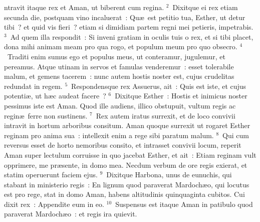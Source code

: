 \bchapter
{}ntravit itaque rex et Aman, ut biberent cum regina.
${}^{2}$~Dixitque ei rex etiam secunda die, postquam vino incaluerat~: Qu\ae\ est petitio tua, Esther, ut detur tibi~? et quid vis fieri~? etiam si dimidiam partem regni mei petieris, impetrabis.
${}^{3}$~Ad quem illa respondit~: Si inveni gratiam in oculis tuis o rex, et si tibi placet, dona mihi animam meam pro qua rogo, et populum meum pro quo obsecro.
${}^{4}$~Traditi enim sumus ego et populus meus, ut conteramur, jugulemur, et pereamus. Atque utinam in servos et famulas venderemur~: esset tolerabile malum, et gemens tacerem~: nunc autem hostis noster est, cujus crudelitas redundat in regem.
${}^{5}$~Respondensque rex Assuerus, ait~: Quis est iste, et cujus potenti\ae , ut h\ae c audeat facere~?
${}^{6}$~Dixitque Esther~: Hostis et inimicus noster pessimus iste est Aman. Quod ille audiens, illico obstupuit, vultum regis ac regin\ae\ ferre non sustinens.
${}^{7}$~Rex autem iratus surrexit, et de loco convivii intravit in hortum arboribus consitum. Aman quoque surrexit ut rogaret Esther reginam pro anima sua~: intellexit enim a rege sibi paratum malum.
${}^{8}$~Qui cum reversus esset de horto nemoribus consito, et intrasset convivii locum, reperit Aman super lectulum corruisse in quo jacebat Esther, et ait~: Etiam reginam vult opprimere, me pr\ae sente, in domo mea. Necdum verbum de ore regis exierat, et statim operuerunt faciem ejus.
${}^{9}$~Dixitque Harbona, unus de eunuchis, qui stabant in ministerio regis~: En lignum quod paraverat Mardoch\ae o, qui locutus est pro rege, stat in domo Aman, habens altitudinis quinquaginta cubitos. Cui dixit rex~: Appendite eum in eo.
${}^{10}$~Suspensus est itaque Aman in patibulo quod paraverat Mardoch\ae o~: et regis ira quievit.

